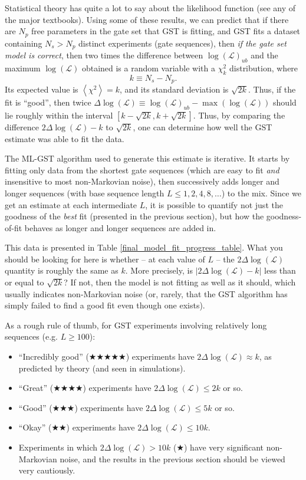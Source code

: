 \documentclass{article}[11pt]
\newcommand{\expec}[1]{\ensuremath{\left\langle#1\right\rangle}}
\begin{document}
{Statistical theory has quite a lot to say about the likelihood function (see any of the major textbooks).  Using some of these results, we can predict that if there are $N_p$ free parameters in the gate set that GST is fitting, and GST fits a dataset containing $N_s > N_p$ distinct experiments (gate sequences), then \emph{if the gate set model is correct}, then two times the difference between $\log(\mathcal{L})_{ub}$ and the maximum $\log(\mathcal{L})$ obtained is a random variable with a $\chi^2_{k}$ distribution, where
$$k \equiv N_s - N_p.$$
Its expected value is $\expec{\chi^2}=k$, and its standard deviation is $\sqrt{2k}$.  Thus, if the fit is ``good'', then twice $\Delta\log(\mathcal{L}) \equiv \log(\mathcal{L})_{ub} - \max(\log(\mathcal{L}))$ should lie roughly within the interval $[k-\sqrt{2k},k+\sqrt{2k}]$.
Thus, by comparing the difference $2\Delta\log(\mathcal{L}) - k$ to $\sqrt{2k}$, one can determine how well the GST estimate was able to fit the data.

The ML-GST algorithm used to generate this estimate is iterative.  It starts by fitting only data from the shortest gate sequences (which are easy to fit \emph{and} insensitive to most non-Markovian noise), then successively adds longer and longer sequences (with base sequence length $L\leq 1,2,4,8,\ldots$) to the mix.  Since we get an estimate at each intermediate $L$, it is possible to quantify not just the goodness of the \emph{best} fit (presented in the previous section), but how the goodness-of-fit behaves as longer and longer sequences are added in.

This data is presented in Table \ref{final_model_fit_progress_table}.  What you should be looking for here is whether -- at each value of $L$ -- the $2\Delta\log(\mathcal{L})$ quantity is roughly the same as $k$.  More precisely, is $|2\Delta\log(\mathcal{L})-k|$ less than or equal to $\sqrt{2k}$?  If not, then the model is not fitting as well as it should, which usually indicates non-Markovian noise (or, rarely, that the GST algorithm has simply failed to find a good fit even though one exists).

As a rough rule of thumb, for GST experiments involving relatively long sequences (e.g. $L\geq100$):
\begin{itemize}
\item ``Incredibly good'' ($\bigstar\bigstar\bigstar\bigstar\bigstar$) experiments have $2\Delta\log(\mathcal{L}) \approx k$, as predicted by theory (and seen in simulations).
\item ``Great'' ($\bigstar\bigstar\bigstar\bigstar$) experiments have $2\Delta\log(\mathcal{L}) \leq 2k$ or so.
\item ``Good'' ($\bigstar\bigstar\bigstar$) experiments have $2\Delta\log(\mathcal{L}) \leq 5k$ or so.
\item ``Okay'' ($\bigstar\bigstar$) experiments have $2\Delta\log(\mathcal{L}) \leq 10k$.
\item Experiments in which $2\Delta\log(\mathcal{L}) > 10k$ ($\bigstar$) have very significant non-Markovian noise, and the results in the previous section should be viewed very cautiously.
\end{itemize}

}
\end{document}
